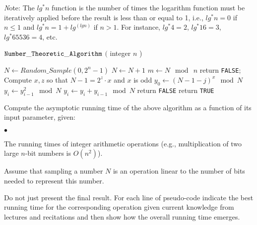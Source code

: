\documentclass{article}
\newenvironment{myitem}{\begin{list}{$\bullet$}
{\setlength{\itemsep}{-0pt}
\setlength{\topsep}{0pt}
\setlength{\labelwidth}{0pt}
\setlength{\leftmargin}{10pt}
\setlength{\parsep}{-0pt}
\setlength{\itemsep}{0pt}
\setlength{\partopsep}{0pt}}}%
{\end{list}}
\begin{document}
{\emph Note:} The $lg^*n$ function is the number of times the
logarithm function must be iteratively applied before the result is
less than or equal to 1, i.e., $lg^*n = 0$ if $n \leq 1$ and $lg^*n =
1 + lg^(lgn)$ if $n > 1$. For instance, $lg^*4=2$, $lg^*16=3$,
$lg^*65536=4$, etc.


\begin{algorithm}[h]
\caption{${\tt Number\_Theoretic\_Algorithm}$ $($ integer $n$ ) }
\label{algo}
$N \leftarrow Random\_Sample( 0, 2^n-1)$\;
{
  $N \leftarrow N + 1$\;
}
$m \leftarrow N \mod\ n$\;
{
  {
    return {\tt FALSE};
  }
  Compute $x,z$ so that $N - 1 = 2^z \cdot x$ and $x$ is odd\;
  $y_0 \leftarrow (N-1-j)^x \mod N$\;
  {
    $y_i \leftarrow y_{i-1}^2 \mod N$\;
    $y_i \leftarrow y_i + y_{i-1} \mod N$\;
  }
  {
    return {\tt FALSE}\;
  }
}
return {\tt TRUE}\;
\end{algorithm}

 Compute the asymptotic running time of the
above algorithm as a function of its input parameter, given:

\begin{myitem}
\item The running times of integer arithmetic operations (e.g.,
  multiplication of two large $n$-bit numbers is $O(n^2)$).
\item Assume that sampling a number $N$ is an operation linear to the
  number of bits needed to represent this number.
\end{myitem}

\noindent Do not just present the final result. For each line of
pseudo-code indicate the best running time for the corresponding
operation given current knowledge from lectures and recitations and
then show how the overall running time emerges.\\
\end{document}
